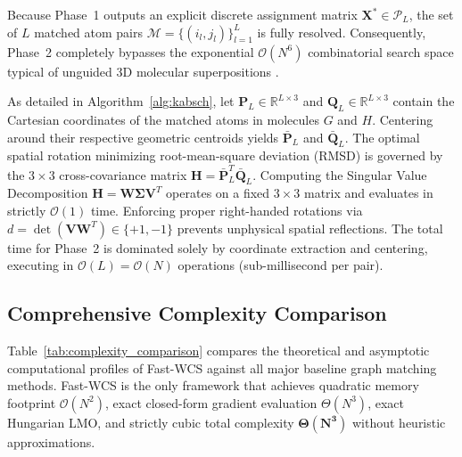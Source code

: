 \documentclass[conference]{IEEEtran}
\begin{document}
Because Phase~1 outputs an explicit discrete assignment matrix $\mathbf{X}^* \in \mathcal{P}_L$, the set of $L$ matched atom pairs $\mathcal{M} = \{(i_l, j_l)\}_{l=1}^L$ is fully resolved. Consequently, Phase~2 completely bypasses the exponential $\mathcal{O}(N^6)$ combinatorial search space typical of unguided 3D molecular superpositions \cite{kabsch1976solution}.

As detailed in Algorithm~\ref{alg:kabsch}, let $\mathbf{P}_L \in \mathbb{R}^{L \times 3}$ and $\mathbf{Q}_L \in \mathbb{R}^{L \times 3}$ contain the Cartesian coordinates of the matched atoms in molecules $G$ and $H$. Centering around their respective geometric centroids yields $\bar{\mathbf{P}}_L$ and $\bar{\mathbf{Q}}_L$. The optimal spatial rotation minimizing root-mean-square deviation (RMSD) is governed by the $3 \times 3$ cross-covariance matrix $\mathbf{H} = \bar{\mathbf{P}}_L^T \bar{\mathbf{Q}}_L$. Computing the Singular Value Decomposition $\mathbf{H} = \mathbf{W}\mathbf{\Sigma}\mathbf{V}^T$ operates on a fixed $3 \times 3$ matrix and evaluates in strictly $\mathcal{O}(1)$ time. Enforcing proper right-handed rotations via $d = \det(\mathbf{V}\mathbf{W}^T) \in \{+1, -1\}$ prevents unphysical spatial reflections. The total time for Phase~2 is dominated solely by coordinate extraction and centering, executing in $\mathcal{O}(L) = \mathcal{O}(N)$ operations (sub-millisecond per pair).

\subsection{Comprehensive Complexity Comparison}

Table~\ref{tab:complexity_comparison} compares the theoretical and asymptotic computational profiles of Fast-WCS against all major baseline graph matching methods. Fast-WCS is the only framework that achieves quadratic memory footprint $\mathcal{O}(N^2)$, exact closed-form gradient evaluation $\Theta(N^3)$, exact Hungarian LMO, and strictly cubic total complexity $\mathbf{\Theta(N^3)}$ without heuristic approximations.
\end{document}
